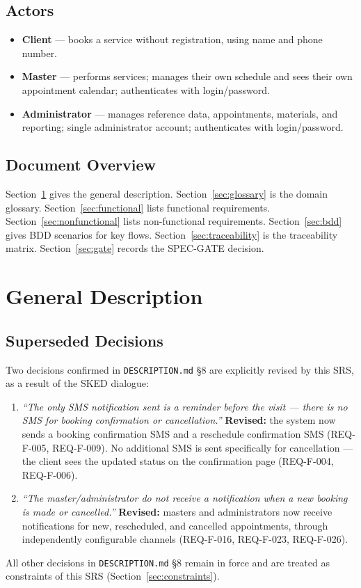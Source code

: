 \documentclass[11pt,a4paper]{article}
\begin{document}
\subsection{Actors}
\begin{itemize}[leftmargin=1.2cm]
  \item \textbf{Client} --- books a service without registration, using
    name and phone number.
  \item \textbf{Master} --- performs services; manages their own schedule
    and sees their own appointment calendar; authenticates with login/password.
  \item \textbf{Administrator} --- manages reference data, appointments,
    materials, and reporting; single administrator account; authenticates
    with login/password.
\end{itemize}

\subsection{Document Overview}
Section~\ref{sec:general} gives the general description. Section~\ref{sec:glossary}
is the domain glossary. Section~\ref{sec:functional} lists functional
requirements. Section~\ref{sec:nonfunctional} lists non-functional
requirements. Section~\ref{sec:bdd} gives BDD scenarios for key flows.
Section~\ref{sec:traceability} is the traceability matrix.
Section~\ref{sec:gate} records the SPEC-GATE decision.

\section{General Description}
\label{sec:general}

\subsection{Superseded Decisions}
\label{sec:superseded}
Two decisions confirmed in \texttt{DESCRIPTION.md} \S8 are explicitly
revised by this SRS, as a result of the SKED dialogue:

\begin{enumerate}[leftmargin=1.2cm]
  \item \emph{``The only SMS notification sent is a reminder before the
    visit --- there is no SMS for booking confirmation or cancellation.''}
    \textbf{Revised:} the system now sends a booking confirmation SMS and a
    reschedule confirmation SMS (REQ-F-005, REQ-F-009). No additional SMS is
    sent specifically for cancellation --- the client sees the updated
    status on the confirmation page (REQ-F-004, REQ-F-006).
  \item \emph{``The master/administrator do not receive a notification when
    a new booking is made or cancelled.''}
    \textbf{Revised:} masters and administrators now receive notifications
    for new, rescheduled, and cancelled appointments, through independently
    configurable channels (REQ-F-016, REQ-F-023, REQ-F-026).
\end{enumerate}
All other decisions in \texttt{DESCRIPTION.md} \S8 remain in force and are
treated as constraints of this SRS (Section~\ref{sec:constraints}).
\end{document}
